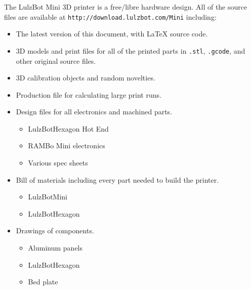 %
%
%
%
%

The LulzBot\textsuperscript{\miniscule{\texttrademark}} Mini 3D printer is a free/libre hardware design. All of the source files are available at \texttt{http://download.lulzbot.com/Mini} including:

\begin{itemize}
\item The latest version of this document, with {\LaTeX} source code.

\item 3D models and print files for all of the printed parts in \texttt{.stl}, \texttt{.gcode}, and other original source files.

\item 3D calibration objects and random novelties.

\item Production file for calculating large print runs.

\item Design files for all electronics and machined parts.

\begin{itemize} %
\item LulzBot\texttrademark Hexagon Hot End
\item RAMBo Mini electronics
\item Various spec sheets
\end{itemize} %

\item Bill of materials including every part needed to build the printer.
\begin{itemize} %
\item LulzBot\texttrademark Mini
\item LulzBot\texttrademark Hexagon
\end{itemize} %

\item Drawings of components.
\begin{itemize} %
\item Aluminum panels
\item LulzBot\texttrademark Hexagon
\item Bed plate
\end{itemize} %


\end{itemize}
